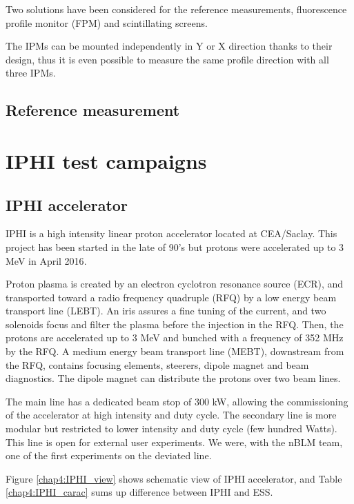 \begin{refsection}
  Two solutions have been considered for the reference measurements, fluorescence profile monitor (FPM) and scintillating screens.

  The IPMs can be mounted independently in Y or X direction thanks to their design, thus it is even possible to measure the same profile direction with all three IPMs.

  


  \subsection{Reference measurement}
  \section{IPHI test campaigns}
  \subsection{IPHI accelerator}
  IPHI is a high intensity linear proton accelerator located at CEA/Saclay.
  This project has been started in the late of 90's\cite{Beau2000} but protons were accelerated up to 3 MeV in April 2016\cite{Gobin2016}.

  Proton plasma is created by an electron cyclotron resonance source (ECR), and transported toward a radio frequency quadruple (RFQ) by a low energy beam transport line (LEBT).
  An iris assures a fine tuning of the current, and two solenoids focus and filter the plasma before the injection in the RFQ.
  Then, the protons are accelerated up to 3 MeV and bunched with a frequency of 352 MHz by the RFQ.
  A medium energy beam transport line (MEBT), downstream from the RFQ, contains focusing elements, steerers, dipole magnet and beam diagnostics.
  The dipole magnet can distribute the protons over two beam lines.

  The main line has a dedicated beam stop of 300 kW, allowing the commissioning of the accelerator at high intensity and duty cycle.
  The secondary line is more modular but restricted to lower intensity and duty cycle (few hundred Watts).
  This line is open for external user experiments.
  We were, with the nBLM team, one of the first experiments on the deviated line\cite{Senee:IPAC2018-TUPAF016}.

  Figure \ref{chap4:IPHI_view} shows schematic view of IPHI accelerator, and Table \ref{chap4:IPHI_carac} sums up difference between IPHI and ESS.

  
  
  

\end{refsection}
